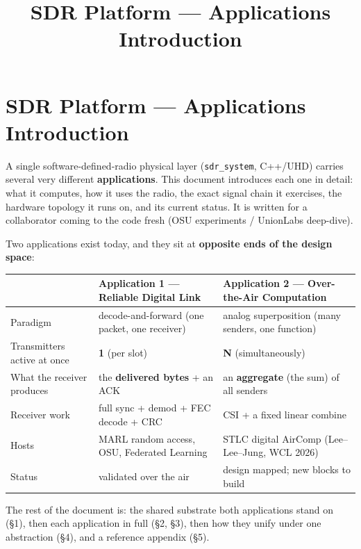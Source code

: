 \documentclass[
  10pt,
]{article}
\title{SDR Platform — Applications Introduction}
\author{}
\date{}
\begin{document}
\maketitle

{
\hypersetup{linkcolor=}
\setcounter{tocdepth}{2}
\tableofcontents
}
\hypertarget{sdr-platform--applications-introduction}{%
\section{SDR Platform --- Applications
Introduction}\label{sdr-platform--applications-introduction}}

A single software-defined-radio physical layer (\texttt{sdr\_system},
C++/UHD) carries several very different \textbf{applications}. This
document introduces each one in detail: what it computes, how it uses
the radio, the exact signal chain it exercises, the hardware topology it
runs on, and its current status. It is written for a collaborator coming
to the code fresh (OSU experiments / UnionLabs deep-dive).

Two applications exist today, and they sit at \textbf{opposite ends of
the design space}:

\begin{longtable}[]{@{}lll@{}}
\toprule
& \textbf{Application 1 --- Reliable Digital Link} & \textbf{Application
2 --- Over-the-Air Computation} \\
\midrule
\endhead
Paradigm & decode-and-forward (one packet, one receiver) & analog
superposition (many senders, one function) \\
Transmitters active at once & \textbf{1} (per slot) & \textbf{N}
(simultaneously) \\
What the receiver produces & the \textbf{delivered bytes} + an ACK & an
\textbf{aggregate} (the sum) of all senders \\
Receiver work & full sync + demod + FEC decode + CRC & CSI + a fixed
linear combine \\
Hosts & MARL random access, OSU, Federated Learning & STLC digital
AirComp (Lee--Lee--Jung, WCL 2026) \\
Status & validated over the air & design mapped; new blocks to build \\
\bottomrule
\end{longtable}

The rest of the document is: the shared substrate both applications
stand on (§1), then each application in full (§2, §3), then how they
unify under one abstraction (§4), and a reference appendix (§5).
\end{document}
